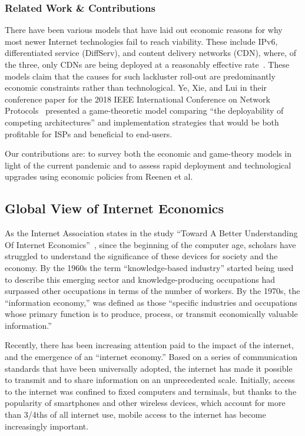 \documentclass[journal]{IEEEtran}
\begin{document}
\subsubsection{Related Work \& Contributions}
There have been various models that have laid out economic reasons for why most newer Internet technologies fail to reach viability. These include IPv6, differentiated service (DiffServ), and content delivery networks (CDN), where, of the three, only CDNs are being deployed at a reasonably effective rate~\cite{IPv6_Adoption}. These models claim that the causes for such lackluster roll-out are predominantly economic constraints rather than technological. Ye, Xie, and Lui in their conference paper for the 2018 IEEE International Conference on Network Protocols~\cite{IEEE_Deployability} presented a game-theoretic model comparing \enquote{the deployability of competing architectures} and implementation strategies that would be both profitable for ISPs and beneficial to end-users.

Our contributions are: to survey both the economic and game-theory models in light of the current pandemic and to assess rapid deployment and technological upgrades using economic policies from Reenen et al.

\subsection{Global View of Internet Economics}
As the Internet Association states in the study \enquote{Toward A Better Understanding Of Internet Economics}~\cite{IA_IE}, since the beginning of the computer age, scholars have struggled to understand the significance of these devices for society and the economy. By the 1960s the term \enquote{knowledge-based industry} started being used to describe this emerging sector and knowledge-producing occupations had surpassed other occupations in terms of the number of workers. By the 1970s, the \enquote{information economy,} was defined as those \enquote{specific industries and occupations whose primary function is to produce, process, or transmit economically valuable information.}

Recently, there has been increasing attention paid to the impact of the internet, and the emergence of an \enquote{internet economy.} Based on a series of communication standards that have been universally adopted, the internet has made it possible to transmit and to share information on an unprecedented scale. Initially, access to the internet was confined to fixed computers and terminals, but thanks to the popularity of smartphones and other wireless devices, which account for more than 3/4ths of all internet use, mobile access to the internet has become increasingly important.
\end{document}
